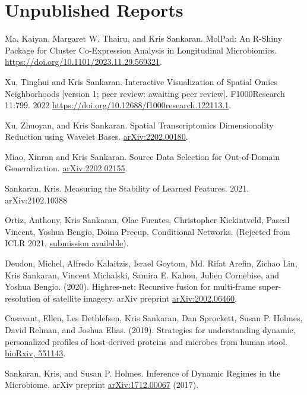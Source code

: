 \documentclass[letterpaper]{article}
\renewenvironment{itemize}{
  \begin{list}{}{
    \setlength{\leftmargin}{1.5em}
  }
}{
  \end{list}
}
\begin{document}
\section*{Unpublished Reports}
\begin{itemize}
\item Ma, Kaiyan, Margaret W. Thairu, and Kris Sankaran. MolPad:
An R-Shiny Package for Cluster Co-Expression Analysis in Longitudinal
Microbiomics.
\href{https://doi.org/10.1101/2023.11.29.569321}{https://doi.org/10.1101/2023.11.29.569321}.
\item Xu, Tinghui and Kris Sankaran. Interactive Visualization of
Spatial Omics Neighborhoods [version 1; peer review: awaiting peer review]. F1000Research 11:799. 2022
\href{https://doi.org/10.12688/f1000research.122113.1}{https://doi.org/10.12688/f1000research.122113.1}.
\item Xu, Zhuoyan, and Kris Sankaran. Spatial Transcriptomics
Dimensionality Reduction using Wavelet Bases. \href{https://arxiv.org/abs/2202.00180}{arXiv:2202.00180}.
\item Miao, Xinran and Kris Sankaran. Source Data Selection for
Out-of-Domain Generalization.
\href{https://arxiv.org/abs/2202.02155}{arXiv:2202.02155}.
\item Sankaran, Kris. Measuring the Stability of Learned Features. 2021.
arXiv:2102.10388
\item Ortiz, Anthony, Kris Sankaran, Olac Fuentes, Christopher Kiekintveld,
  Pascal Vincent, Yoshua Bengio, Doina Precup. Conditional Networks. (Rejected
  from ICLR 2021, \href{https://openreview.net/forum?id=h8q8iZi-ks}{submission
    available}).
\item Deudon, Michel, Alfredo Kalaitzis, Israel Goytom, Md. Rifat Arefin, Zichao
  Lin, Kris Sankaran, Vincent Michalski, Samira E. Kahou, Julien Cornebise, and
  Yoshua Bengio. (2020). Highres-net: Recursive fusion for multi-frame
  super-resolution of satellite imagery. arXiv preprint
  \href{https://arxiv.org/abs/2002.06460}{arXiv:2002.06460}.
\item Casavant, Ellen, Les Dethlefsen, Kris Sankaran, Dan Sprockett, Susan P.
  Holmes, David Relman, and Joshua Elias. (2019). Strategies for understanding
  dynamic, personalized profiles of host-derived proteins and microbes from
  human stool. \href{https://www.biorxiv.org/content/10.1101/551143v1}{bioRxiv, 551143}.
 \item Sankaran, Kris, and Susan P. Holmes. Inference of Dynamic Regimes in the
   Microbiome. arXiv preprint \href{https://arxiv.org/abs/1712.00067}{arXiv:1712.00067} (2017).

\end{itemize}
\end{document}
